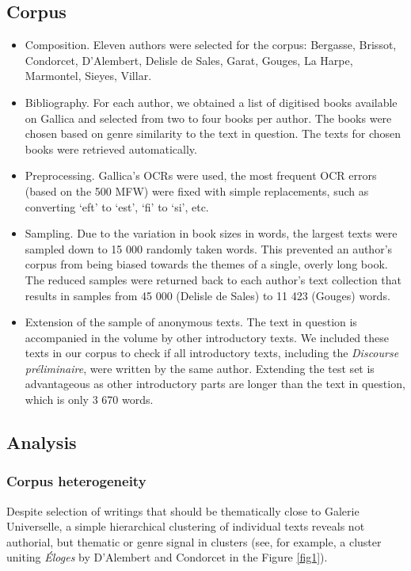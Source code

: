 \documentclass[12pt, letterpaper]{article}
\begin{document}
\subsection{Corpus}
    \begin{itemize}
        \item Composition. Eleven authors were selected for the corpus: Bergasse, Brissot, Condorcet, D'Alembert, Delisle de Sales, Garat, Gouges, La Harpe, Marmontel, Sieyes, Villar.

        \item Bibliography. For each author, we obtained a list of digitised books available on Gallica and selected from two to four books per author. The books were chosen based on genre similarity to the text in question. The texts for chosen books were retrieved automatically.

        \item Preprocessing. Gallica's OCRs were used, the most frequent OCR errors (based on the 500 MFW) were fixed with simple replacements, such as converting `eft' to `est', `fi' to `si', etc.

        \item Sampling. Due to the variation in book sizes in words, the largest texts were sampled down to 15 000 randomly taken words. This prevented an author's corpus from being biased towards the themes of a single, overly long book. The reduced samples were returned back to each author's text collection that results in samples from 45 000 (Delisle de Sales) to 11 423 (Gouges) words.

        \item Extension of the sample of anonymous texts. The text in question is accompanied in the volume by other introductory texts. We included these texts in our corpus to check if all introductory texts, including the \emph{Discourse préliminaire}, were written by the same author.  Extending the test set is advantageous as other introductory parts are longer than the text in question, which is only 3 670 words.

    \end{itemize}

\subsection{Analysis}
\subsubsection{Corpus heterogeneity}
Despite selection of writings that should be thematically close to Galerie Universelle, a simple hierarchical clustering of individual texts reveals not authorial, but thematic or genre signal in clusters (see, for example, a cluster uniting \textit{Éloges} by D'Alembert and Condorcet in the Figure \ref{fig1}).
\end{document}
